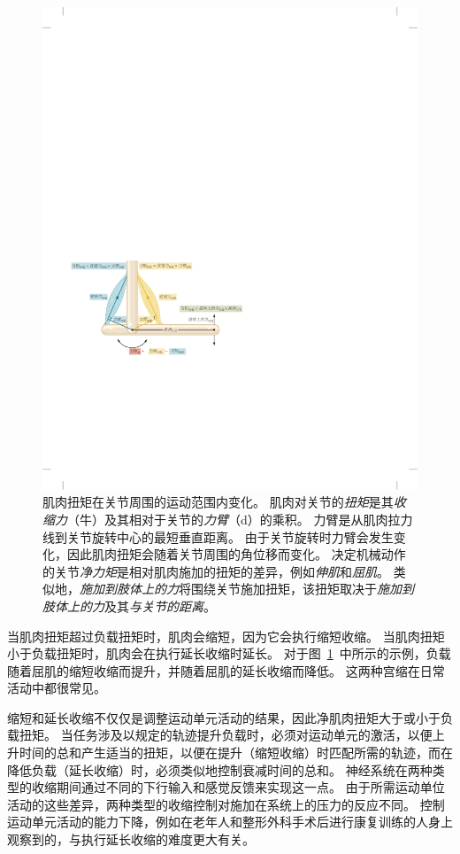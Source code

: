 \begin{figure}[htbp]
	\centering
	\includegraphics[width=0.75\linewidth]{chap31/fig_31_14}
	\caption{肌肉扭矩在关节周围的运动范围内变化。
	肌肉对关节的\textit{扭矩}是其\textit{收缩力}（牛）及其相对于关节的\textit{力臂}（d）的乘积。
	力臂是从肌肉拉力线到关节旋转中心的最短垂直距离。
	由于关节旋转时力臂会发生变化，因此肌肉扭矩会随着关节周围的角位移而变化。
	决定机械动作的关节\textit{净力矩}是相对肌肉施加的扭矩的差异，例如\textit{伸肌}和\textit{屈肌}。
	类似地，\textit{施加到肢体上的力}将围绕关节施加扭矩，该扭矩取决于\textit{施加到肢体上的力}及其\textit{与关节的距离}。}
	\label{fig:31_14}
\end{figure}


当肌肉扭矩超过负载扭矩时，肌肉会缩短，因为它会执行缩短收缩。
当肌肉扭矩小于负载扭矩时，肌肉会在执行延长收缩时延长。
对于图~\ref{fig:31_14}~中所示的示例，负载随着屈肌的缩短收缩而提升，并随着屈肌的延长收缩而降低。
这两种宫缩在日常活动中都很常见。


缩短和延长收缩不仅仅是调整运动单元活动的结果，因此净肌肉扭矩大于或小于负载扭矩。
当任务涉及以规定的轨迹提升负载时，必须对运动单元的激活，以便上升时间的总和产生适当的扭矩，以便在提升（缩短收缩）时匹配所需的轨迹，而在降低负载（延长收缩）时，必须类似地控制衰减时间的总和。
神经系统在两种类型的收缩期间通过不同的下行输入和感觉反馈来实现这一点。
由于所需运动单位活动的这些差异，两种类型的收缩控制对施加在系统上的压力的反应不同。
控制运动单元活动的能力下降，例如在老年人和整形外科手术后进行康复训练的人身上观察到的，与执行延长收缩的难度更大有关。


